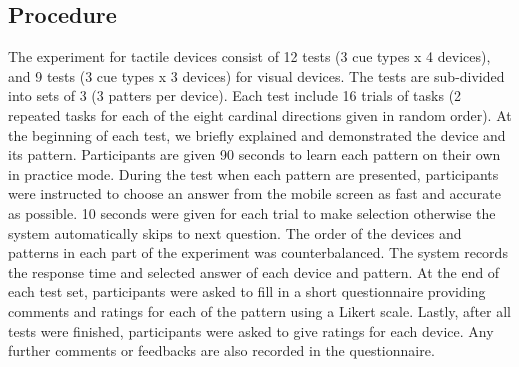 \documentclass{sigchi}
\begin{document}
\subsection{Procedure}


The experiment for tactile devices consist of 12 tests (3 cue types x 4 devices), and 9 tests (3 cue types x 3 devices) for visual devices. The tests are sub-divided into sets of 3 (3 patters per device). Each test include 16 trials of tasks (2 repeated tasks for each of the eight cardinal directions given in random order). At the beginning of each test, we briefly explained and demonstrated the device and its pattern. Participants are given 90 seconds to learn each pattern on their own in practice mode. During the test when each pattern are presented, participants were instructed to choose an answer from the mobile screen as fast and accurate as possible. 10 seconds were given for each trial to make selection otherwise the system automatically skips to next question. The order of the devices and patterns in each part of the experiment was counterbalanced. The system records the response time and selected answer of each device and pattern. At the end of each test set, participants were asked to fill in a short questionnaire providing comments and ratings for each of the pattern using a Likert scale. Lastly, after all tests were finished, participants were asked to give ratings for each device. Any further comments or feedbacks are also recorded in the questionnaire.
\end{document}
